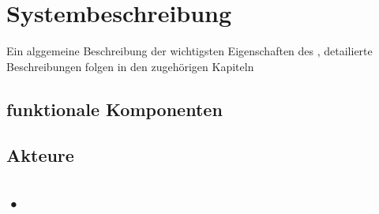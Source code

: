 \chapter{Systembeschreibung}
Ein alggemeine Beschreibung der wichtigsten Eigenschaften des \brand , detailierte Beschreibungen folgen in den 
zugehörigen Kapiteln

\section{funktionale Komponenten}


\section{Akteure}

\section{•}